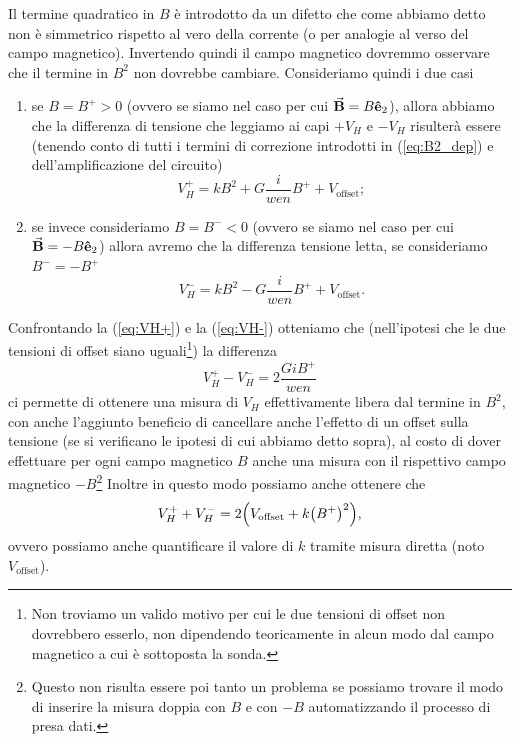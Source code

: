 \documentclass[fleqn,varvw,preprintnumbers,citeautoscript]{memo}
\begin{document}
Il termine quadratico in $B$ è introdotto da un difetto che come abbiamo detto non è simmetrico rispetto al vero della corrente (o per analogie al verso del campo magnetico). Invertendo quindi il campo magnetico dovremmo osservare che il termine in $B^2$ non dovrebbe cambiare. Consideriamo quindi i due casi \begin{enumerate}[1.]
    \item se $B=B^+>0$ (ovvero se siamo nel caso per cui $\va{B} = B\vu{e}_2$), allora abbiamo che la differenza di tensione che leggiamo ai capi $+V_H$ e $-V_H$ risulterà essere (tenendo conto di tutti i termini di correzione introdotti in (\ref{eq:B2_dep}) e dell'amplificazione del circuito) \begin{equation}
        V_H^+ = kB^2 + G\frac{i}{wen}B^+ + V_\text{offset};\label{eq:VH+}
    \end{equation}
    \item se invece consideriamo $B=B^-<0$ (ovvero se siamo nel caso per cui $\va{B} = -B\vu{e}_2$) allora avremo che la differenza tensione letta, se consideriamo $B^- = -B^+$ \begin{equation}
        V_H^- = kB^2 - G\frac{i}{wen}B^+ + V_\text{offset}.\label{eq:VH-}
    \end{equation}
\end{enumerate}
Confrontando la (\ref{eq:VH+}) e la (\ref{eq:VH-}) otteniamo che (nell'ipotesi che le due tensioni di offset siano uguali\footnote{Non troviamo un valido motivo per cui le due tensioni di offset non dovrebbero esserlo, non dipendendo teoricamente in alcun modo dal campo magnetico a cui è sottoposta la sonda.}) la differenza \begin{equation}
    V_H^+ - V_H^- = 2\frac{GiB^+}{wen}
\end{equation} ci permette di ottenere una misura di $V_H$ effettivamente libera dal termine in $B^2$, con anche l'aggiunto beneficio di cancellare anche l'effetto di un offset sulla tensione (se si verificano le ipotesi di cui abbiamo detto sopra), al costo di dover effettuare per ogni campo magnetico $B$ anche una misura con il rispettivo campo magnetico $-B$\footnote{Questo non risulta essere poi tanto un problema se possiamo trovare il modo di inserire la misura doppia con $B$ e con $-B$ automatizzando il processo di presa dati.} Inoltre in questo modo possiamo anche ottenere che \begin{equation}
    V_H^++V_H^- = 2\qty(V_\text{offset} + k\qty(B^+)^2),
\end{equation} ovvero possiamo anche quantificare il valore di $k$ tramite misura diretta (noto $V_\text{offset}$).
\end{document}
